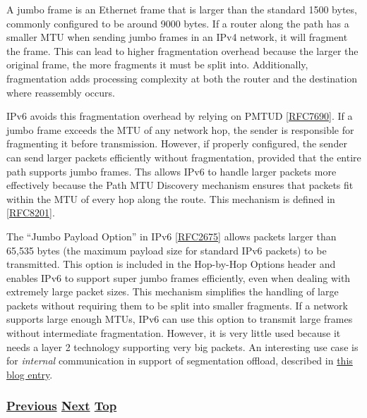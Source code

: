 \documentclass[
]{article}
\begin{document}
A jumbo frame is an Ethernet frame that is larger than the standard 1500
bytes, commonly configured to be around 9000 bytes. If a router along
the path has a smaller MTU when sending jumbo frames in an IPv4 network,
it will fragment the frame. This can lead to higher fragmentation
overhead because the larger the original frame, the more fragments it
must be split into. Additionally, fragmentation adds processing
complexity at both the router and the destination where reassembly
occurs.

IPv6 avoids this fragmentation overhead by relying on PMTUD
{[}\href{https://www.rfc-editor.org/info/rfc7690}{RFC7690}{]}. If a
jumbo frame exceeds the MTU of any network hop, the sender is
responsible for fragmenting it before transmission. However, if properly
configured, the sender can send larger packets efficiently without
fragmentation, provided that the entire path supports jumbo frames. Ths
allows IPv6 to handle larger packets more effectively because the Path
MTU Discovery mechanism ensures that packets fit within the MTU of every
hop along the route. This mechanism is defined in
{[}\href{https://www.rfc-editor.org/info/rfc8201}{RFC8201}{]}.

The ``Jumbo Payload Option'' in IPv6
{[}\href{https://www.rfc-editor.org/info/rfc2675}{RFC2675}{]} allows
packets larger than 65,535 bytes (the maximum payload size for standard
IPv6 packets) to be transmitted. This option is included in the
Hop-by-Hop Options header and enables IPv6 to support super jumbo frames
efficiently, even when dealing with extremely large packet sizes. This
mechanism simplifies the handling of large packets without requiring
them to be split into smaller fragments. If a network supports large
enough MTUs, IPv6 can use this option to transmit large frames without
intermediate fragmentation. However, it is very little used because it
needs a layer 2 technology supporting very big packets. An interesting
use case is for \emph{internal} communication in support of segmentation
offload, described in
\href{https://www.sipanda.io/post/segmentation-offload-and-protocols-let-s-be-friends}{this
blog entry}.

\subsubsection{\texorpdfstring{\hyperref[energy-consumption]{Previous}
\hyperref[basic-windows-commands]{Next}
\hyperref[management-and-operations]{Top}}{Previous Next Top}}\label{previous-next-top-33}
\end{document}
